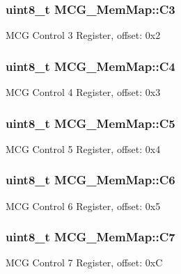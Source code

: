 \subsubsection[{C3}]{\setlength{\rightskip}{0pt plus 5cm}uint8\+\_\+t M\+C\+G\+\_\+\+Mem\+Map\+::\+C3}\label{struct_m_c_g___mem_map_a58ca70b30279c98af3471abe38280f01}
M\+C\+G Control 3 Register, offset\+: 0x2 \hypertarget{struct_m_c_g___mem_map_a3c5615d70ed3f2d3664de1a8fdbe9983}{}
\subsubsection[{C4}]{\setlength{\rightskip}{0pt plus 5cm}uint8\+\_\+t M\+C\+G\+\_\+\+Mem\+Map\+::\+C4}\label{struct_m_c_g___mem_map_a3c5615d70ed3f2d3664de1a8fdbe9983}
M\+C\+G Control 4 Register, offset\+: 0x3 \hypertarget{struct_m_c_g___mem_map_a0e385950fe0f38c82eae57eb4ea2aaf3}{}
\subsubsection[{C5}]{\setlength{\rightskip}{0pt plus 5cm}uint8\+\_\+t M\+C\+G\+\_\+\+Mem\+Map\+::\+C5}\label{struct_m_c_g___mem_map_a0e385950fe0f38c82eae57eb4ea2aaf3}
M\+C\+G Control 5 Register, offset\+: 0x4 \hypertarget{struct_m_c_g___mem_map_ae7f9f9ae65de91e230a236ca4629380c}{}
\subsubsection[{C6}]{\setlength{\rightskip}{0pt plus 5cm}uint8\+\_\+t M\+C\+G\+\_\+\+Mem\+Map\+::\+C6}\label{struct_m_c_g___mem_map_ae7f9f9ae65de91e230a236ca4629380c}
M\+C\+G Control 6 Register, offset\+: 0x5 \hypertarget{struct_m_c_g___mem_map_a7be430dafe8d0fddf4dbb83781946201}{}
\subsubsection[{C7}]{\setlength{\rightskip}{0pt plus 5cm}uint8\+\_\+t M\+C\+G\+\_\+\+Mem\+Map\+::\+C7}\label{struct_m_c_g___mem_map_a7be430dafe8d0fddf4dbb83781946201}
M\+C\+G Control 7 Register, offset\+: 0x\+C \hypertarget{struct_m_c_g___mem_map_a346a8b8c5c2c675e6297aaa1f14798df}{}

